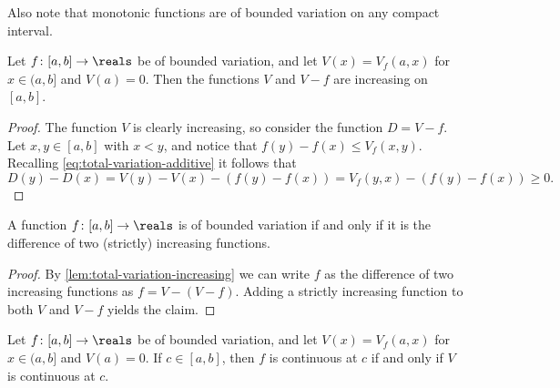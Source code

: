 \documentclass[article, a4paper, 11pt, oneside]{memoir}
\numberwithin{equation}{chapter}
\begin{document}
Also note that monotonic functions are of bounded variation on any compact interval.

\begin{lemma}
    \label{lem:total-variation-increasing}
    Let $f \colon [a,b] \to \reals$ be of bounded variation, and let $V(x) = V_f(a,x)$ for $x \in (a, b]$ and $V(a) = 0$. Then the functions $V$ and $V - f$ are increasing on $[a,b]$.
\end{lemma}

\begin{proof}
    The function $V$ is clearly increasing, so consider the function $D = V-f$. Let $x,y \in [a,b]$ with $x < y$, and notice that $f(y) - f(x) \leq V_f(x,y)$. Recalling \cref{eq:total-variation-additive} it follows that
    \begin{equation*}
        D(y) - D(x)
            = V(y) - V(x) - (f(y) - f(x))
            = V_f(y,x) - (f(y) - f(x))
            \geq 0.
    \end{equation*}
\end{proof}


\begin{proposition}
    \label{prop:BV-difference-of-increasing-functions}
    A function $f \colon [a,b] \to \reals$ is of bounded variation if and only if it is the difference of two (strictly) increasing functions.
\end{proposition}

\begin{proof}
    By \cref{lem:total-variation-increasing} we can write $f$ as the difference of two increasing functions as $f = V - (V - f)$. Adding a strictly increasing function to both $V$ and $V - f$ yields the claim.
\end{proof}


\begin{proposition}
    \label{prop:total-variation-continuity}
    Let $f \colon [a,b] \to \reals$ be of bounded variation, and let $V(x) = V_f(a,x)$ for $x \in (a, b]$ and $V(a) = 0$. If $c \in [a,b]$, then $f$ is continuous at $c$ if and only if $V$ is continuous at $c$.
\end{proposition}
\end{document}
